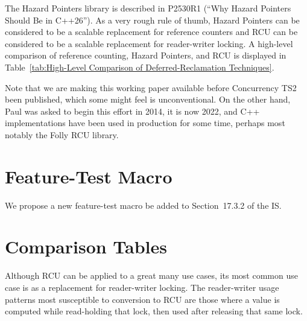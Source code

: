 The Hazard Pointers library is described in P2530R1 (``Why Hazard Pointers
Should Be in C++26'').
As a very rough rule of thumb, Hazard Pointers can be considered to be
a scalable replacement for reference counters and RCU can be considered
to be a scalable replacement for reader-writer locking.
A high-level comparison of reference counting, Hazard Pointers, and RCU
is displayed in
Table~\ref{tab:High-Level Comparison of Deferred-Reclamation Techniques}.

Note that we are making this working paper available before Concurrency
TS2 been published, which some might feel is unconventional.
On the other hand, Paul was asked to begin this effort in 2014, it is now
2022, and C++ implementations have been used in production for some time,
perhaps most notably the Folly RCU library.

\section{Feature-Test Macro}
\label{sec:Feature-Test Macro}

We propose a new feature-test macro
 be added to Section~17.3.2 of the IS.

\section{Comparison Tables}
\label{sec:Comparison Tables}

Although RCU can be applied to a great many use cases, its most common
use case is as a replacement for reader-writer locking.
The reader-writer usage patterns most susceptible to conversion to RCU
are those where a value is computed while read-holding that lock, then
used after releasing that same lock.

